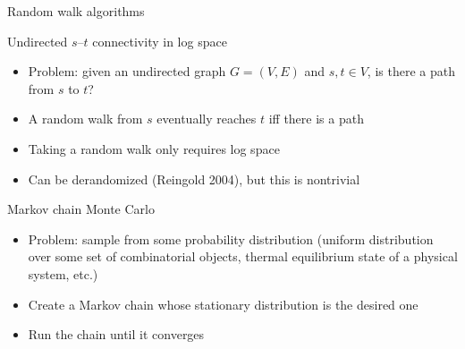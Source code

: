 
\begin{frame}{Random walk algorithms}

Undirected $s$--$t$ connectivity in log space
\begin{itemize}
  \item Problem: given an undirected graph $G=(V,E)$ and $s,t \in V$, is there a path from $s$ to $t$?
  \item A random walk from $s$ eventually reaches $t$ iff there is a path
  \item Taking a random walk only requires log space
  \item Can be derandomized (Reingold 2004), but this is nontrivial
\end{itemize}

\pause
\bigskip

Markov chain Monte Carlo
\begin{itemize}
  \item Problem: sample from some probability distribution (uniform distribution over some set of combinatorial objects, thermal equilibrium state of a physical system, etc.)
  \item Create a Markov chain whose stationary distribution is the desired one
  \item Run the chain until it converges
\end{itemize}

\end{frame}


